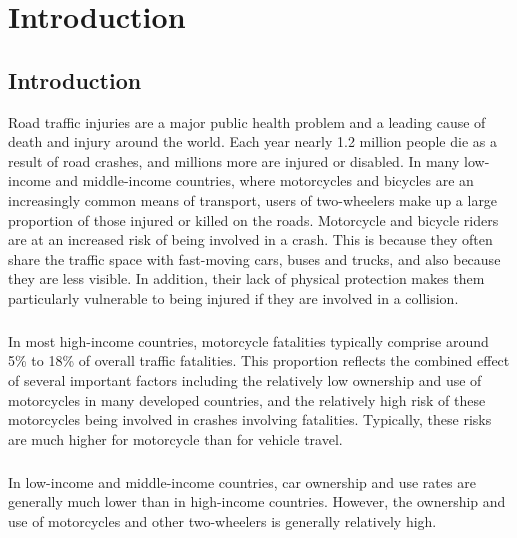 \chapter{Introduction}
\section{Introduction}
Road traffic injuries are a major public health problem and a leading cause of death and injury around
the world. Each year nearly 1.2 million people die as a result of road crashes, and millions more are
injured or disabled. In many low-income and middle-income countries, where motorcycles and bicycles
are an increasingly common means of transport, users of two-wheelers make up a large proportion of
those injured or killed on the roads. Motorcycle and bicycle riders are at an increased risk of being
involved in a crash. This is because they often share the traffic space with fast-moving cars, buses and
trucks, and also because they are less visible. In addition, their lack of physical protection makes them
particularly vulnerable to being injured if they are involved in a collision.\vspace{.5cm}

\paragraph{}In most high-income countries, motorcycle fatalities typically comprise around 5\% to 18\% of overall
traffic fatalities. This proportion reflects the combined effect of several important factors including the
relatively low ownership and use of motorcycles in many developed countries, and the relatively high risk
of these motorcycles being involved in crashes involving fatalities. Typically, these risks are much higher
for motorcycle than for vehicle travel.\vspace{.5cm}

\paragraph{}In low-income and middle-income countries, car ownership and use rates are generally much lower than
in high-income countries. However, the ownership and use of motorcycles and other two-wheelers is
generally relatively high.\vspace{.5cm}

